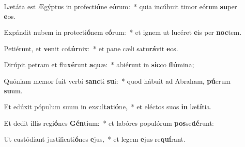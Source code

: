 \item Lætáta est Ægýptus in profecti\textbf{ó}ne e\textbf{ó}rum:~* quia incúbuit timor eórum \textbf{su}per \textbf{e}os.
\item Expándit nubem in protecti\textbf{ó}nem e\textbf{ó}rum:~* et ignem ut lucéret \textbf{e}is per \textbf{noc}tem.
\item Petiérunt, et \textbf{ve}nit co\textbf{túr}nix:~* et pane cæli satu\textbf{rá}vit \textbf{e}os.
\item Dirúpit petram et flu\textbf{xé}runt \textbf{a}quæ:~* abiérunt in \textbf{sic}co \textbf{flú}mina;
\item Quóniam memor fuit verbi \textbf{sanc}ti \textbf{su}i:~* quod hábuit ad Abraham, \textbf{pú}erum \textbf{su}um.
\item Et edúxit pópulum suum in exsul\textbf{ta}ti\textbf{ó}ne,~* et eléctos suos \textbf{in} læ\textbf{tí}tia.
\item Et dedit illis regi\textbf{ó}nes \textbf{Gén}tium:~* et labóres populórum \textbf{pos}se\textbf{dé}runt:
\item Ut custódiant justificati\textbf{ó}nes \textbf{e}jus,~* et legem \textbf{e}jus re\textbf{quí}rant.
